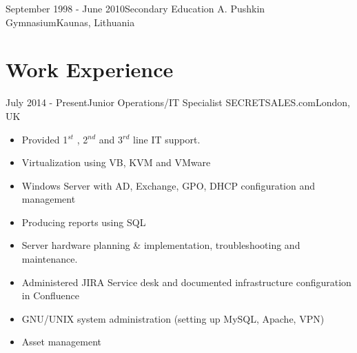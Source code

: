 \documentclass[11pt,a4paper]{moderncv}
\begin{document}
\cventry
	{September 1998 - June 2010}{Secondary Education}
	{A. Pushkin Gymnasium}{Kaunas, Lithuania}
	{}{}
		
\section{Work Experience}

\cventry
	{July 2014 - Present}{Junior Operations/IT Specialist}
	{SECRETSALES.com}{London, UK}
	{}{
        \begin{itemize}
            \item Provided 1$^{st}$ , 2$^{nd}$ and 3$^{rd}$ line IT support.
            \item Virtualization using VB, KVM and VMware
            \item Windows Server with AD, Exchange, GPO, DHCP configuration and management
            \item Producing reports using SQL
            \item Server hardware planning \& implementation, troubleshooting and maintenance.
            \item Administered JIRA Service desk and documented infrastructure configuration in Confluence
            \item GNU/UNIX system administration (setting up MySQL, Apache, VPN)
            \item Asset management
        \end{itemize}
    }
\end{document}
